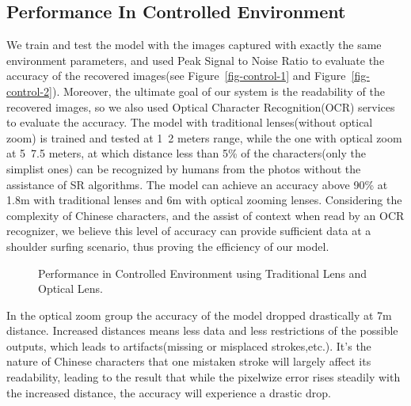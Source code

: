 \subsection{Performance In Controlled Environment}
We train and test the model with the images captured with exactly the same environment parameters, and used Peak Signal to Noise Ratio to evaluate the accuracy of the recovered images(see Figure~\ref{fig-control-1} and Figure~\ref{fig-control-2}). Moreover, the ultimate goal of our system is the readability of the recovered images, so we also used Optical Character Recognition(OCR) services to evaluate the accuracy. The model with traditional lenses(without optical zoom) is trained and tested at 1~2 meters range, while the one with optical zoom at 5~7.5 meters, at which distance less than 5\% of the characters(only the simplist ones) can be recognized by humans from the photos without the assistance of SR algorithms. The model can achieve an accuracy above 90\% at 1.8m with traditional lenses and 6m with optical zooming lenses. Considering the complexity of Chinese characters, and the assist of context when read by an OCR recognizer, we believe this level of accuracy can provide sufficient data at a shoulder surfing scenario, thus proving the efficiency of our model.
\begin{figure}[!t]
    \centering
    \hfill
    \caption{Performance in Controlled Environment using Traditional Lens and Optical Lens.}
    \label{fig:control}
\end{figure}

In the optical zoom group the accuracy of the model dropped drastically at 7m distance. Increased distances means less data and less restrictions of the possible outputs, which leads to artifacts(missing or misplaced strokes,etc.). It's the nature of Chinese characters that one mistaken stroke will largely affect its readability, leading to the result that while the pixelwize error rises steadily with the increased distance, the accuracy will experience a drastic drop.

